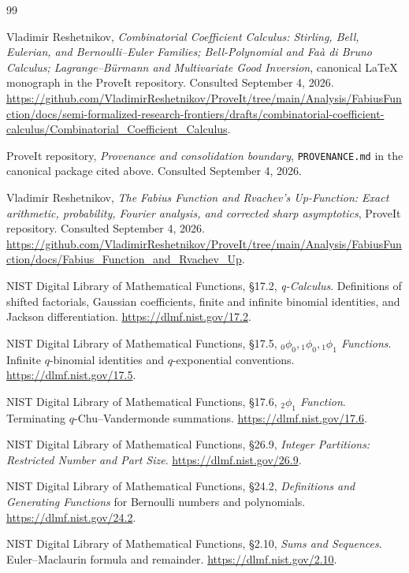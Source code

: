 \documentclass[11pt,a4paper,oneside,openany]{book}
\theoremstyle{definition}
\theoremstyle{remark}
\begin{document}
\backmatter
\begin{thebibliography}{99}

Vladimir Reshetnikov, \emph{Combinatorial Coefficient Calculus: Stirling,
Bell, Eulerian, and Bernoulli--Euler Families; Bell-Polynomial and Fa\`a di
Bruno Calculus; Lagrange--B\"urmann and Multivariate Good Inversion},
canonical \LaTeX{} monograph in the ProveIt repository. Consulted
September 4, 2026.
\url{https://github.com/VladimirReshetnikov/ProveIt/tree/main/Analysis/FabiusFunction/docs/semi-formalized-research-frontiers/drafts/combinatorial-coefficient-calculus/Combinatorial_Coefficient_Calculus}.

ProveIt repository, \emph{Provenance and consolidation boundary},
\texttt{PROVENANCE.md} in the canonical package cited above. Consulted
September 4, 2026.

Vladimir Reshetnikov, \emph{The Fabius Function and Rvachev's Up-Function:
Exact arithmetic, probability, Fourier analysis, and corrected sharp
asymptotics}, ProveIt repository. Consulted September 4, 2026.
\url{https://github.com/VladimirReshetnikov/ProveIt/tree/main/Analysis/FabiusFunction/docs/Fabius_Function_and_Rvachev_Up}.

NIST Digital Library of Mathematical Functions, \S17.2,
\emph{q-Calculus}. Definitions of shifted factorials, Gaussian coefficients,
finite and infinite binomial identities, and Jackson differentiation.
\url{https://dlmf.nist.gov/17.2}.

NIST Digital Library of Mathematical Functions, \S17.5,
\emph{\({}_0\phi_0,{}_1\phi_0,{}_1\phi_1\) Functions}.
Infinite \(q\)-binomial identities and \(q\)-exponential conventions.
\url{https://dlmf.nist.gov/17.5}.

NIST Digital Library of Mathematical Functions, \S17.6,
\emph{\({}_2\phi_1\) Function}. Terminating \(q\)-Chu--Vandermonde
summations.
\url{https://dlmf.nist.gov/17.6}.

NIST Digital Library of Mathematical Functions, \S26.9,
\emph{Integer Partitions: Restricted Number and Part Size}.
\url{https://dlmf.nist.gov/26.9}.

NIST Digital Library of Mathematical Functions, \S24.2,
\emph{Definitions and Generating Functions} for Bernoulli numbers and
polynomials.
\url{https://dlmf.nist.gov/24.2}.

NIST Digital Library of Mathematical Functions, \S2.10,
\emph{Sums and Sequences}. Euler--Maclaurin formula and remainder.
\url{https://dlmf.nist.gov/2.10}.


\end{thebibliography}
\end{document}
